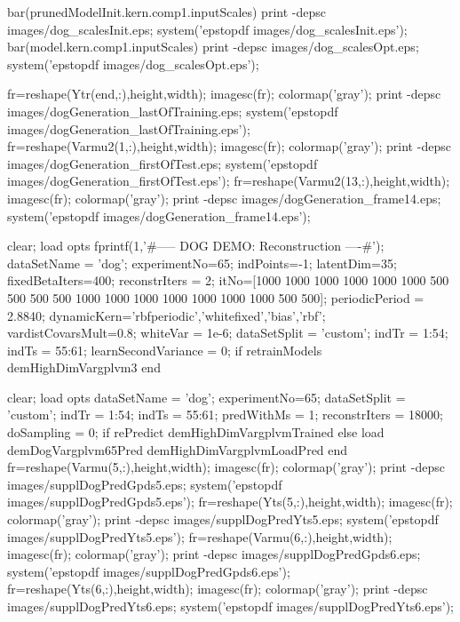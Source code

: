 \documentclass{article} %
\newenvironment{matlab}{\comment}{\endcomment}
\begin{document}
\begin{matlab}
bar(prunedModelInit.kern.comp{1}.inputScales)
print -depsc images/dog_scalesInit.eps; system('epstopdf images/dog_scalesInit.eps');
bar(model.kern.comp{1}.inputScales)
print -depsc images/dog_scalesOpt.eps; system('epstopdf images/dog_scalesOpt.eps');

fr=reshape(Ytr(end,:),height,width); imagesc(fr); colormap('gray'); %
print -depsc images/dogGeneration_lastOfTraining.eps; system('epstopdf images/dogGeneration_lastOfTraining.eps');
fr=reshape(Varmu2(1,:),height,width); imagesc(fr); colormap('gray');  %
print -depsc images/dogGeneration_firstOfTest.eps; system('epstopdf images/dogGeneration_firstOfTest.eps');
fr=reshape(Varmu2(13,:),height,width); imagesc(fr); colormap('gray'); %
print -depsc images/dogGeneration_frame14.eps; system('epstopdf images/dogGeneration_frame14.eps');




clear; load opts
fprintf(1,'\n\n#-----  DOG DEMO: Reconstruction ----#\n');
dataSetName = 'dog';
experimentNo=65;
indPoints=-1; latentDim=35;
fixedBetaIters=400;
reconstrIters = 2;
itNo=[1000 1000 1000 1000 1000 1000 500 500 500 500 1000 1000 1000 1000 1000 1000 1000 500 500]; %
periodicPeriod = 2.8840;
dynamicKern={'rbfperiodic','whitefixed','bias','rbf'};
vardistCovarsMult=0.8;
whiteVar = 1e-6;
dataSetSplit = 'custom';
indTr = 1:54;
indTs = 55:61;
learnSecondVariance = 0;
if retrainModels
    demHighDimVargplvm3
end


clear; load opts
dataSetName = 'dog';
experimentNo=65;
dataSetSplit = 'custom';
indTr = 1:54; indTs = 55:61;
predWithMs = 1; %
reconstrIters = 18000; 
doSampling = 0;
if rePredict
    demHighDimVargplvmTrained
else
    load demDogVargplvm65Pred
    demHighDimVargplvmLoadPred
end
fr=reshape(Varmu(5,:),height,width); imagesc(fr); colormap('gray'); 
print -depsc images/supplDogPredGpds5.eps; system('epstopdf images/supplDogPredGpds5.eps');
fr=reshape(Yts(5,:),height,width); imagesc(fr); colormap('gray'); 
print -depsc images/supplDogPredYts5.eps; system('epstopdf images/supplDogPredYts5.eps');
fr=reshape(Varmu(6,:),height,width); imagesc(fr); colormap('gray'); 
print -depsc images/supplDogPredGpds6.eps; system('epstopdf images/supplDogPredGpds6.eps');
fr=reshape(Yts(6,:),height,width); imagesc(fr); colormap('gray'); 
print -depsc images/supplDogPredYts6.eps; system('epstopdf images/supplDogPredYts6.eps');


\end{matlab}
\end{document}

